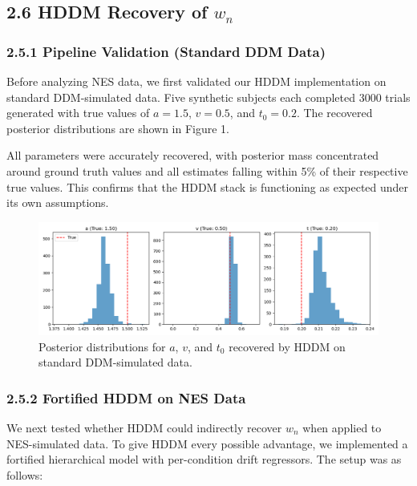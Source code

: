 \documentclass[
  11pt,
]{article}
\begin{document}
\subsection{\texorpdfstring{2.6 HDDM Recovery of
\(w_n\)}{2.6 HDDM Recovery of w\_n}}\label{hddm-recovery-of-w_n}

\subsubsection{2.5.1 Pipeline Validation (Standard DDM
Data)}\label{pipeline-validation-standard-ddm-data}

Before analyzing NES data, we first validated our HDDM implementation on
standard DDM-simulated data. Five synthetic subjects each completed 3000
trials generated with true values of \(a = 1.5\), \(v = 0.5\), and
\(t_0 = 0.2\). The recovered posterior distributions are shown in Figure
1.

All parameters were accurately recovered, with posterior mass
concentrated around ground truth values and all estimates falling within
5\% of their respective true values. This confirms that the HDDM stack
is functioning as expected under its own assumptions.

\begin{figure}
\centering
\includegraphics[width=0.9\linewidth,height=\textheight,keepaspectratio]{figures/hddm_sanity_check.png}
\caption{Posterior distributions for \(a\), \(v\), and \(t_0\) recovered
by HDDM on standard DDM-simulated data.}\label{fig:hddm_sanity}
\end{figure}

\subsubsection{2.5.2 Fortified HDDM on NES
Data}\label{fortified-hddm-on-nes-data}

We next tested whether HDDM could indirectly recover \(w_n\) when
applied to NES-simulated data. To give HDDM every possible advantage, we
implemented a fortified hierarchical model with per-condition drift
regressors. The setup was as follows:
\end{document}
